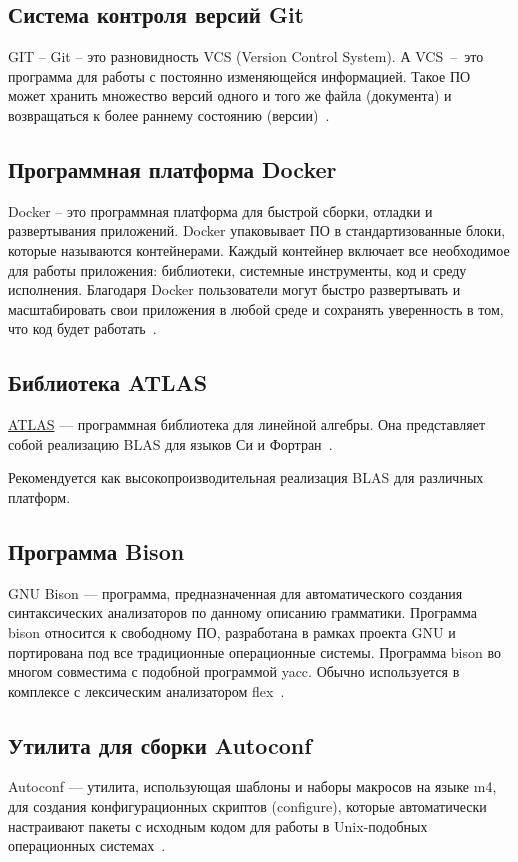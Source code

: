 \subsection{Система контроля версий Git}
GIT – Git – это разновидность VCS (Version Control System).
А VCS~–~это программа для работы с постоянно изменяющейся информацией. Такое ПО
может хранить множество версий одного и того же файла (документа) и возвращаться
к более раннему состоянию (версии)~\cite{git}.

\subsection{Программная платформа Docker}
Docker – это программная платформа для быстрой сборки, отладки и развертывания
приложений. Docker упаковывает ПО в стандартизованные блоки, которые называются
контейнерами. Каждый контейнер включает все необходимое для работы приложения:
библиотеки, системные инструменты, код и среду исполнения. Благодаря Docker
пользователи могут быстро развертывать и масштабировать свои приложения в любой
среде и сохранять уверенность в том, что код будет работать~\cite{docker}.

\subsection{Библиотека ATLAS}
\hyperlink{atlas}{ATLAS} — программная библиотека для линейной алгебры. Она
представляет собой реализацию BLAS для языков Си и Фортран~\cite{atlas}.

Рекомендуется как высокопроизводительная реализация BLAS для различных платформ.

\subsection{Программа Bison}
GNU Bison — программа, предназначенная для автоматического создания
синтаксических анализаторов по данному описанию грамматики. Программа bison
относится к свободному ПО, разработана в рамках проекта GNU и портирована под
все традиционные операционные системы. Программа bison во многом совместима с
подобной программой yacc. Обычно используется в комплексе с лексическим
анализатором flex~\cite{bison}.

\subsection{Утилита для сборки Autoconf}
Autoconf — утилита, использующая шаблоны и наборы макросов на языке m4, для
создания конфигурационных скриптов (configure), которые автоматически настраивают
пакеты с исходным кодом для работы в Unix-подобных операционных системах~\cite{autoconf}.

